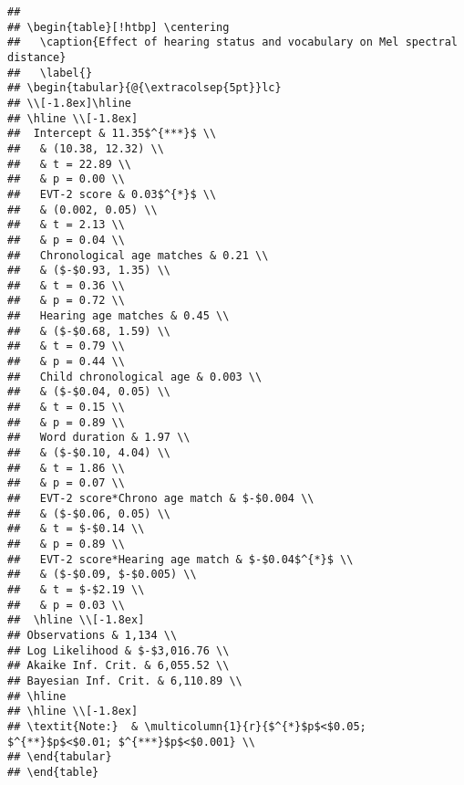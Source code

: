 \documentclass[
]{article}
\begin{document}
\begin{verbatim}
## 
## \begin{table}[!htbp] \centering 
##   \caption{Effect of hearing status and vocabulary on Mel spectral distance} 
##   \label{} 
## \begin{tabular}{@{\extracolsep{5pt}}lc} 
## \\[-1.8ex]\hline 
## \hline \\[-1.8ex] 
##  Intercept & 11.35$^{***}$ \\ 
##   & (10.38, 12.32) \\ 
##   & t = 22.89 \\ 
##   & p = 0.00 \\ 
##   EVT-2 score & 0.03$^{*}$ \\ 
##   & (0.002, 0.05) \\ 
##   & t = 2.13 \\ 
##   & p = 0.04 \\ 
##   Chronological age matches & 0.21 \\ 
##   & ($-$0.93, 1.35) \\ 
##   & t = 0.36 \\ 
##   & p = 0.72 \\ 
##   Hearing age matches & 0.45 \\ 
##   & ($-$0.68, 1.59) \\ 
##   & t = 0.79 \\ 
##   & p = 0.44 \\ 
##   Child chronological age & 0.003 \\ 
##   & ($-$0.04, 0.05) \\ 
##   & t = 0.15 \\ 
##   & p = 0.89 \\ 
##   Word duration & 1.97 \\ 
##   & ($-$0.10, 4.04) \\ 
##   & t = 1.86 \\ 
##   & p = 0.07 \\ 
##   EVT-2 score*Chrono age match & $-$0.004 \\ 
##   & ($-$0.06, 0.05) \\ 
##   & t = $-$0.14 \\ 
##   & p = 0.89 \\ 
##   EVT-2 score*Hearing age match & $-$0.04$^{*}$ \\ 
##   & ($-$0.09, $-$0.005) \\ 
##   & t = $-$2.19 \\ 
##   & p = 0.03 \\ 
##  \hline \\[-1.8ex] 
## Observations & 1,134 \\ 
## Log Likelihood & $-$3,016.76 \\ 
## Akaike Inf. Crit. & 6,055.52 \\ 
## Bayesian Inf. Crit. & 6,110.89 \\ 
## \hline 
## \hline \\[-1.8ex] 
## \textit{Note:}  & \multicolumn{1}{r}{$^{*}$p$<$0.05; $^{**}$p$<$0.01; $^{***}$p$<$0.001} \\ 
## \end{tabular} 
## \end{table}
\end{verbatim}
\end{document}

